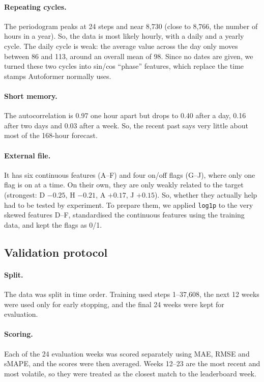 \documentclass[11pt,a4paper]{article}
\begin{document}
\paragraph{Repeating cycles.} The periodogram peaks at 24 steps and near 8{,}730 (close to 8{,}766, the number of hours in a year). So, the data is most likely hourly, with a daily and a yearly cycle. The daily cycle is weak: the average value across the day only moves between 86 and 113, around an overall mean of 98. Since no dates are given, we turned these two cycles into sin/cos ``phase'' features, which replace the time stamps Autoformer normally uses.

\paragraph{Short memory.} The autocorrelation is 0.97 one hour apart but drops to 0.40 after a day, 0.16 after two days and 0.03 after a week. So, the recent past says very little about most of the 168-hour forecast.

\paragraph{External file.} It has six continuous features (A--F) and four on/off flags (G--J), where only one flag is on at a time. On their own, they are only weakly related to the target (strongest: D $-0.25$, H $-0.21$, A $+0.17$, J $+0.15$). So, whether they actually help had to be tested by experiment. To prepare them, we applied \texttt{log1p} to the very skewed features D--F, standardised the continuous features using the training data, and kept the flags as 0/1.

\subsection*{Validation protocol}

\paragraph{Split.} The data was split in time order. Training used steps 1--37{,}608, the next 12 weeks were used only for early stopping, and the final 24 weeks were kept for evaluation.

\paragraph{Scoring.} Each of the 24 evaluation weeks was scored separately using MAE, RMSE and sMAPE, and the scores were then averaged. Weeks 12--23 are the most recent and most volatile, so they were treated as the closest match to the leaderboard week.
\end{document}

